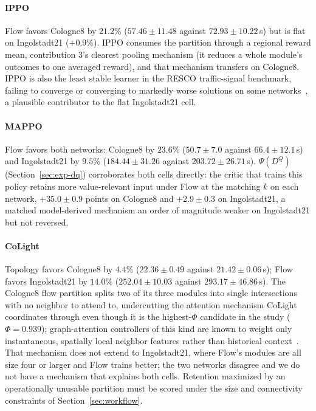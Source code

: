 \documentclass[journal]{IEEEtran}
\theoremstyle{definition}
\begin{document}
\paragraph{IPPO}
Flow favors Cologne8 by $21.2\%$ ($57.46\pm11.48$ against $72.93\pm10.22$\,s) but is flat on Ingolstadt21 ($+0.9\%$). IPPO consumes the partition through a regional reward mean, contribution 3's clearest pooling mechanism (it reduces a whole module's outcomes to one averaged reward), and that mechanism transfers on Cologne8.
IPPO is also the least stable learner in the RESCO traffic-signal benchmark, failing to converge or converging to markedly worse solutions on some networks~\citep{ault2021resco}, a plausible contributor to the flat Ingolstadt21 cell.

\paragraph{MAPPO}
Flow favors both networks: Cologne8 by $23.6\%$ ($50.7\pm7.0$ against $66.4\pm12.1$\,s) and Ingolstadt21 by $9.5\%$ ($184.44\pm31.26$ against $203.72\pm26.71$\,s). $\Psi(D^Q)$ (Section~\ref{sec:exp-dq}) corroborates both cells directly: the critic that trains this policy retains more value-relevant input under Flow at the matching $k$ on each network, $+35.0\pm0.9$ points on Cologne8 and $+2.9\pm0.3$ on Ingolstadt21, a matched model-derived mechanism an order of magnitude weaker on Ingolstadt21 but not reversed.

\paragraph{CoLight}
Topology favors Cologne8 by $4.4\%$ ($22.36\pm0.49$ against $21.42\pm0.06$\,s); Flow favors Ingolstadt21 by $14.0\%$ ($252.04\pm10.03$ against $293.17\pm46.86$\,s).
The Cologne8 flow partition splits two of its three modules into single intersections with no neighbor to attend to, undercutting the attention mechanism CoLight coordinates through even though it is the highest-$\Phi$ candidate in the study ($\Phi=0.939$); graph-attention controllers of this kind are known to weight only instantaneous, spatially local neighbor features rather than historical context~\citep{lu2023dualight}. That mechanism does not extend to Ingolstadt21, where Flow's modules are all size four or larger and Flow trains better; the two networks disagree and we do not have a mechanism that explains both cells. Retention maximized by an operationally unusable partition must be scored under the size and connectivity constraints of Section~\ref{sec:workflow}.
\end{document}
